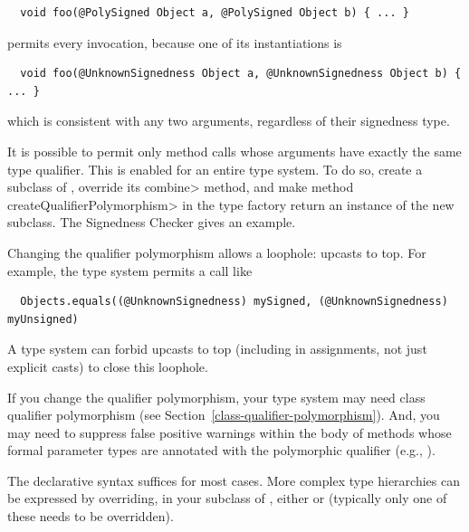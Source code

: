 \begin{Verbatim}
  void foo(@PolySigned Object a, @PolySigned Object b) { ... }
\end{Verbatim}

\noindent
permits every invocation, because one of its instantiations is

\begin{Verbatim}
  void foo(@UnknownSignedness Object a, @UnknownSignedness Object b) { ... }
\end{Verbatim}

\noindent
which is consistent with any two arguments, regardless of their signedness
type.

It is possible to permit only method calls whose arguments have exactly the
same type qualifier.  This is enabled for an entire type system.  To do so,
create a subclass of
, override its
\<combine> method, and make method \<createQualifierPolymorphism> in the
type factory return an instance of the new subclass.  The Signedness
Checker gives an example.

Changing the qualifier polymorphism allows a loophole:  upcasts to top.
For example, the type system permits a call like

\begin{Verbatim}
  Objects.equals((@UnknownSignedness) mySigned, (@UnknownSignedness) myUnsigned)
\end{Verbatim}

\noindent
A type system can forbid upcasts to top (including in assignments, not just
explicit casts) to close this loophole.

If you change the qualifier polymorphism, your type system may need class
qualifier polymorphism (see Section~\ref{class-qualifier-polymorphism}).
And, you may need to suppress
false positive warnings within the body of methods whose formal parameter
types are annotated with the polymorphic qualifier (e.g.,
).



The declarative syntax suffices for most cases.  More complex type
hierarchies can be expressed by overriding, in your subclass of
, either
or 
(typically only one of these needs to be overridden).

